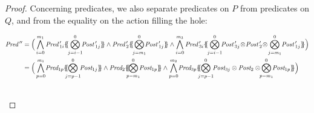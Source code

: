 \documentclass{lmcs}
\newcommand{\shortotimes}{\!\otimes\!}
\begin{document}
\begin{proof}
Concerning predicates, we also separate predicates on $P$ from predicates on $Q$, and from the equality on the action filling the hole:
\begin{footnotesize}
\begin{align*}
\Pred\,''&=\Big(\bigwedge_{i=0}^{m_1}\Pred\,'_{1i}\subst{\bigotimes_{j=i-1}^{0}\!\!\Post\,'_{1j}}\land\Pred\,'_2 \subst{\bigotimes_{j=m_1}^{0}\!\!\Post\,'_{1j}}\land%
\bigwedge_{i=0}^{m_3}\Pred\,'_{3i}\subst{\bigotimes_{j=i-1}^{0}\!\!\Post\,'_{3j}\shortotimes\Post\,'_2\shortotimes\bigotimes_{j=m_1}^{0}\!\Post\,'_{1j}}\Big)\\
&=\Big(\bigwedge_{p=0}^{m_1}\!\Pred_{1p}\subst{\!\!\bigotimes_{j=p-1}^{0}\!\!\Post_{1j}}\land\Pred_2\subst{\!\!\bigotimes_{p=m_1}^{0}\!\!\Post_{1p}}\land \bigwedge_{p=0}^{m_2}\!\Pred_{3p}\subst{\!\!\bigotimes_{j=p-1}^{0}\!\!\Post_{3j}\otimes\Post_2 \otimes\!\!\bigotimes_{p=m_1}^{0}\!\!\Post_{1p}}\Big)\\&\qquad

\end{align*}
\end{footnotesize}
\end{proof}
\end{document}
